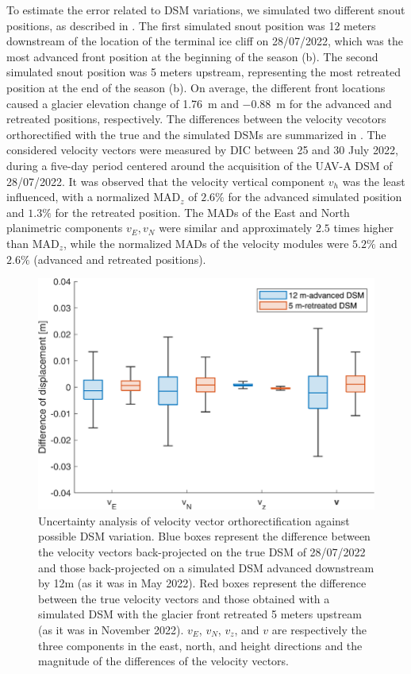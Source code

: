To estimate the error related to DSM variations, we simulated two different snout
positions, as described in .
The first simulated snout position was 12 meters
downstream of the location of the terminal ice cliff on 28/07/2022, which was the most
advanced front position at the beginning of the season
(b).
The second simulated snout position was 5 meters upstream, representing the most
retreated position at the end of the season (b).
On average, the different front locations caused a glacier elevation change of
\SI{+1.76}{\meter} and \SI{-0.88}{\meter} for the advanced
and retreated positions, respectively.
The differences between the velocity vecotors orthorectified with the true and the
simulated DSMs are
summarized in .
The considered velocity vectors were measured by DIC between 25 and 30 July 2022, during
a five-day period centered around the acquisition of the UAV-A DSM of 28/07/2022.
It was observed that the velocity vertical component \(v_h\) was the least influenced,
with a normalized MAD\(_z\) of \(2.6\%\) for
the advanced simulated position and \(1.3\%\) for the retreated position. The MADs of the
East and North planimetric components \(v_E, v_N\) were similar and approximately \(2.5\)
times higher than MAD\(_z\), while the normalized MADs of the velocity modules were
\(5.2\%\) and \(2.6\%\) (advanced and retreated positions).

\begin{figure}
  \centering
  \includegraphics[width=1.0\linewidth]{4_velocity_ortortect_uncertainty.png}
  \caption{Uncertainty analysis of velocity vector orthorectification against possible
    DSM variation. Blue boxes represent the difference between the velocity vectors
    back-projected on the true DSM of 28/07/2022 and those back-projected on a simulated
    DSM advanced downstream by 12m (as it was in May 2022).
    Red boxes represent the difference between the true velocity vectors and those
    obtained with a simulated DSM with the glacier front retreated 5 meters upstream
    (as it was in November 2022).
    \(v_E\), \(v_N\), \(v_z\), and \(v\) are respectively the three components in the
    east, north, and height directions and the magnitude of the differences of the
    velocity vectors.
  }
  \label{fig:4:velocity_ortortect_uncertainty}
\end{figure}

